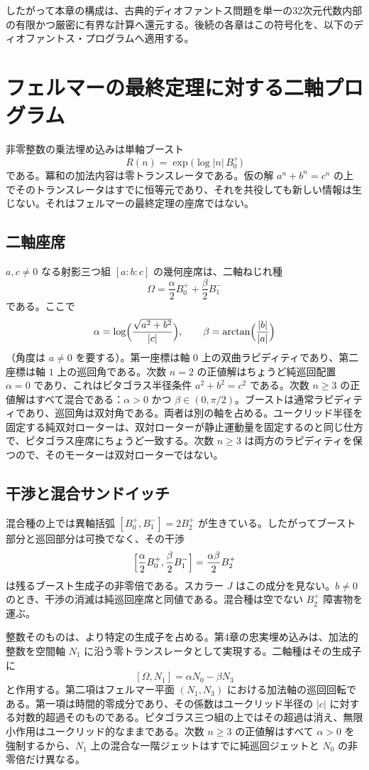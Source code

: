 \documentclass[a4paper]{article}
\theoremstyle{definition}
\theoremstyle{remark}
\begin{document}
したがって本章の構成は、古典的ディオファントス問題を単一の32次元代数内部の有限かつ厳密に有界な計算へ還元する。後続の各章はこの符号化を、以下のディオファントス・プログラムへ適用する。

\section{フェルマーの最終定理に対する二軸プログラム}

非零整数の乗法埋め込みは単軸ブースト
\[
R(n)=\exp\bigl(\log|n|\,B^+_0\bigr)
\]
である。冪和の加法内容は零トランスレータである。仮の解 \(a^n+b^n=c^n\) の上でそのトランスレータはすでに恒等元であり、それを共役しても新しい情報は生じない。それはフェルマーの最終定理の座席ではない。

\subsection{二軸座席}

\(a,c\neq 0\) なる射影三つ組 \([a:b:c]\) の幾何座席は、二軸ねじれ種
\[
\Omega=\frac{\alpha}{2}B^+_0+\frac{\beta}{2}B^-_1
\]
である。ここで
\[
\alpha=\log\Bigl(\frac{\sqrt{a^2+b^2}}{|c|}\Bigr),\qquad
\beta=\arctan\Bigl(\frac{|b|}{|a|}\Bigr)
\]
（角度は \(a\neq 0\) を要する）。第一座標は軸 \(0\) 上の双曲ラピディティであり、第二座標は軸 \(1\) 上の巡回角である。次数 \(n=2\) の正値解はちょうど純巡回配置 \(\alpha=0\) であり、これはピタゴラス半径条件 \(a^2+b^2=c^2\) である。次数 \(n\ge 3\) の正値解はすべて混合である：\(\alpha>0\) かつ \(\beta\in(0,\pi/2)\)。ブーストは通常ラピディティであり、巡回角は双対角である。両者は別の軸を占める。ユークリッド半径を固定する純双対ローターは、双対ローターが静止運動量を固定するのと同じ仕方で、ピタゴラス座席にちょうど一致する。次数 \(n\ge 3\) は両方のラピディティを保つので、そのモーターは双対ローターではない。

\subsection{干渉と混合サンドイッチ}

混合種の上では異軸括弧 \([B^+_0,B^-_1]=2B^+_2\) が生きている。したがってブースト部分と巡回部分は可換でなく、その干渉
\[
\Bigl[\frac{\alpha}{2}B^+_0,\frac{\beta}{2}B^-_1\Bigr]=\frac{\alpha\beta}{2}B^+_2
\]
は残るブースト生成子の非零倍である。スカラー \(J\) はこの成分を見ない。\(b\neq 0\) のとき、干渉の消滅は純巡回座席と同値である。混合種は空でない \(B^+_2\) 障害物を運ぶ。

整数そのものは、より特定の生成子を占める。第4章の忠実埋め込みは、加法的整数を空間軸 \(N_1\) に沿う零トランスレータとして実現する。二軸種はその生成子に
\[
[\Omega,N_1]=\alpha N_0-\beta N_3
\]
と作用する。第二項はフェルマー平面 \((N_1,N_3)\) における加法軸の巡回回転である。第一項は時間的零成分であり、その係数はユークリッド半径の \(|c|\) に対する対数的超過そのものである。ピタゴラス三つ組の上ではその超過は消え、無限小作用はユークリッド的なままである。次数 \(n\ge 3\) の正値解はすべて \(\alpha>0\) を強制するから、\(N_1\) 上の混合な一階ジェットはすでに純巡回ジェットと \(N_0\) の非零倍だけ異なる。
\end{document}
